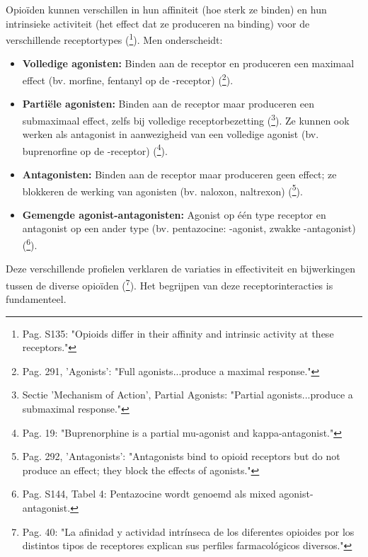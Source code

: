 \documentclass[11pt, a4paper]{report} %
\begin{document}
Opioïden kunnen verschillen in hun affiniteit (hoe sterk ze binden) en hun intrinsieke activiteit (het effect dat ze produceren na binding) voor de verschillende receptortypes (\cite{Trescot2008OpioidPharm}\footnote{Pag. S135: "Opioids differ in their affinity and intrinsic activity at these receptors."}). Men onderscheidt:
\begin{itemize}
    \item \textbf{Volledige agonisten:} Binden aan de receptor en produceren een maximaal effect (bv. morfine, fentanyl op de \textmu-receptor) (\cite{Gupta2010ChemistryOpioids}\footnote{Pag. 291, 'Agonists': "Full agonists...produce a maximal response."}).
    \item \textbf{Partiële agonisten:} Binden aan de receptor maar produceren een submaximaal effect, zelfs bij volledige receptorbezetting (\cite{StatPearlsOpioidReceptor}\footnote{Sectie 'Mechanism of Action', Partial Agonists: "Partial agonists...produce a submaximal response."}). Ze kunnen ook werken als antagonist in aanwezigheid van een volledige agonist (bv. buprenorfine op de \textmu-receptor) (\cite{Kosten2002NeurobiologyDependence}\footnote{Pag. 19: "Buprenorphine is a partial mu-agonist and kappa-antagonist."}).
    \item \textbf{Antagonisten:} Binden aan de receptor maar produceren geen effect; ze blokkeren de werking van agonisten (bv. naloxon, naltrexon) (\cite{Gupta2010ChemistryOpioids}\footnote{Pag. 292, 'Antagonists': "Antagonists bind to opioid receptors but do not produce an effect; they block the effects of agonists."}).
    \item \textbf{Gemengde agonist-antagonisten:} Agonist op één type receptor en antagonist op een ander type (bv. pentazocine: \textkappa-agonist, zwakke \textmu-antagonist) (\cite{Trescot2008OpioidPharm}\footnote{Pag. S144, Tabel 4: Pentazocine wordt genoemd als mixed agonist-antagonist.}).
\end{itemize}
Deze verschillende profielen verklaren de variaties in effectiviteit en bijwerkingen tussen de diverse opioïden (\cite{SciELO2020Opioids}\footnote{Pag. 40: "La afinidad y actividad intrínseca de los diferentes opioides por los distintos tipos de receptores explican sus perfiles farmacológicos diversos."}). Het begrijpen van deze receptorinteracties is fundamenteel.
\end{document}
